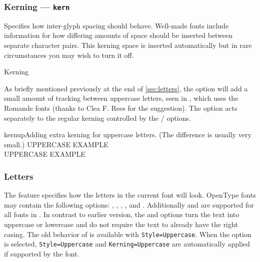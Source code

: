 \documentclass[a4paper]{l3doc}
\begin{document}
\subsubsection{Kerning --- \texttt{kern}}
\label{sec:kerning}

Specifies how inter-glyph spacing should behave.
Well-made fonts include information for how differing
amounts of space should be inserted between separate character pairs.
This kerning space is inserted automatically but in rare
circumstances you may wish to turn it off.

\begin{features}{Kerning}
\end{features}

As briefly mentioned previously at the end of \vref{sec:letters},
the  option will add a small amount of tracking between
uppercase letters, seen in , which uses the Romande
fonts
(thanks to Clea F. Rees for the suggestion).
The  option acts separately to the regular kerning
controlled by the / options.

\begin{Xexample}[firstline=2]{kernup}{Adding extra kerning for uppercase letters. (The difference is usually very small.)}
  \large
   UPPERCASE EXAMPLE \\
   UPPERCASE EXAMPLE
\end{Xexample}


\subsubsection{Letters} \label{sec:letters}
The  feature specifies how the letters in the current font
will look. OpenType fonts may contain the following options:
, ,
, , and
.
Additionally  and  are supported for all fonts
in \LuaTeX.
In contrast to earlier version, the  and  options
turn the text into uppercase or lowercase and do not require the text to already
have the right casing. The old behavior of  is available with
\verb|Style=Uppercase|. When the  option is selected,
\verb|Style=Uppercase| and \verb|Kerning=Uppercase| are automatically applied if
supported by the font.
\end{document}

